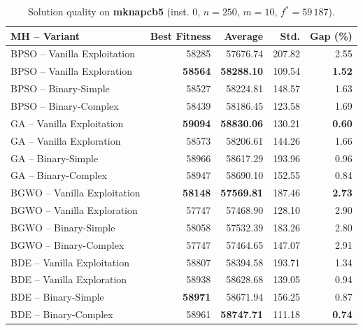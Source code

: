 \documentclass[journal,article,submit,moreauthors]{Definitions/mdpi}
\begin{document}
\begin{table}[htbp]
  \centering
  \small
  \caption{Solution quality on \textbf{mknapcb5} (inst. 0, $n=250$, $m=10$, $f^*=59\,187$).}
  \label{tab:calidad_mknapcb5_0}
  \begin{tabular}{lrrrr}
    \toprule
    \textbf{MH -- Variant} &
    \textbf{Best Fitness} &
    \textbf{Average} &
    \textbf{Std.} &
    \textbf{Gap (\%)} \\
    \midrule
    BPSO -- Vanilla Exploitation &          58285 &         57676.74 & 207.82 &         2.55 \\
    BPSO -- Vanilla Exploration  & \textbf{58564} & \textbf{58288.10} & 109.54 & \textbf{1.52} \\
    BPSO -- Binary-Simple        &          58527 &         58224.81 & 148.57 &         1.63 \\
    BPSO -- Binary-Complex       &          58439 &         58186.45 & 123.58 &         1.69 \\
    \midrule
    GA -- Vanilla Exploitation   & \textbf{59094} & \textbf{58830.06} & 130.21 & \textbf{0.60} \\
    GA -- Vanilla Exploration    &          58573 &         58206.61 & 144.26 &         1.66 \\
    GA -- Binary-Simple          &          58966 &         58617.29 & 193.96 &         0.96 \\
    GA -- Binary-Complex         &          58947 &         58690.10 & 152.55 &         0.84 \\
    \midrule
    BGWO -- Vanilla Exploitation & \textbf{58148} & \textbf{57569.81} & 187.46 & \textbf{2.73} \\
    BGWO -- Vanilla Exploration  &          57747 &         57468.90 & 128.10 &         2.90 \\
    BGWO -- Binary-Simple        &          58058 &         57532.39 & 183.26 &         2.80 \\
    BGWO -- Binary-Complex       &          57747 &         57464.65 & 147.07 &         2.91 \\
    \midrule
    BDE -- Vanilla Exploitation  &          58807 &         58394.58 & 193.71 &         1.34 \\
    BDE -- Vanilla Exploration   &          58938 &         58628.68 & 139.05 &         0.94 \\
    BDE -- Binary-Simple         & \textbf{58971} &         58671.94 & 156.25 &         0.87 \\
    BDE -- Binary-Complex        &          58961 & \textbf{58747.71} & 111.18 & \textbf{0.74} \\
    \bottomrule
  \end{tabular}
\end{table}
\end{document}
